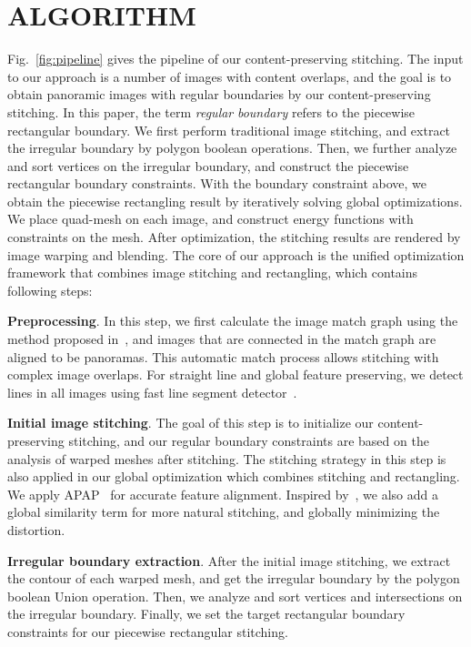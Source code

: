 \documentclass[10pt,journal,compsoc]{IEEEtran}
\begin{document}
 \section{ALGORITHM}
Fig.~\ref{fig:pipeline} gives the pipeline of our content-preserving stitching.
The input to our approach is a number of images with content overlaps, and the goal is to obtain panoramic images with regular boundaries by our content-preserving stitching.
In this paper, the term \emph{regular} \emph{boundary} refers to the piecewise rectangular boundary.
We first perform traditional image stitching, and extract the irregular boundary by polygon boolean operations.  
Then, we further analyze and sort vertices on the irregular boundary, and construct the piecewise rectangular boundary constraints.
With the boundary constraint above, we obtain the piecewise rectangling result by iteratively solving global optimizations.
We place quad-mesh on each image, and construct energy functions with constraints on the mesh. After optimization, the stitching results are rendered by image warping and blending.
The core of our approach is the unified optimization framework that combines image stitching and rectangling, which contains following steps:

\textbf{Preprocessing}.
In this step, we first calculate the image match graph using the method proposed in~\cite{journals/ijcv/BrownL07}, and images that are connected in the match graph are aligned to be panoramas. This automatic match process allows stitching with complex image overlaps.
For straight line and global feature preserving, we detect lines in all images using fast line segment detector~\cite{journals/pami/GioiJMR10}.

\textbf{Initial image stitching}.
The goal of this step is to initialize our content-preserving stitching, and our regular boundary constraints are based on the analysis of warped meshes after stitching. The stitching strategy in this step is also applied in our global optimization which combines stitching and rectangling.
We apply APAP~\cite{journals/pami/ZaragozaCTBS14} for accurate feature alignment.
Inspired by~\cite{conf/eccv/ChenC16}, we also add a global similarity term for more natural stitching, and globally minimizing the distortion.

\textbf{Irregular boundary extraction}.
After the initial image stitching, we extract the contour of each warped mesh, and get the irregular boundary by the polygon boolean Union operation.
Then, we analyze and sort vertices and intersections on the irregular boundary.
Finally, we set the target rectangular boundary constraints for our piecewise rectangular stitching.
\end{document}
